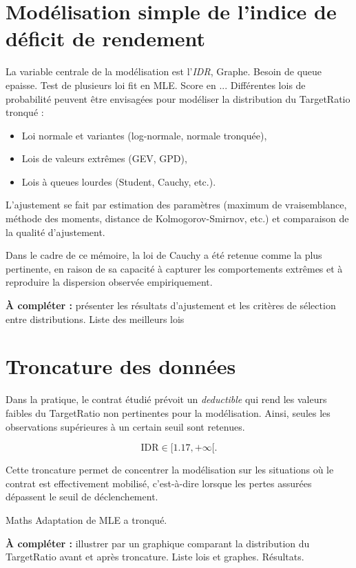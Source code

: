 \documentclass[11pt,a4paper,openright,twoside]{report}
\begin{document}
\section{Modélisation simple de l'indice de déficit de rendement}
La variable centrale de la modélisation est l'\textit{IDR}, 
Graphe.
Besoin de queue epaisse.
Test de plusieurs loi
fit en MLE. Score en ...
Différentes lois de probabilité peuvent être envisagées pour modéliser la distribution du TargetRatio tronqué :  
\begin{itemize}
    \item Loi normale et variantes (log-normale, normale tronquée),
    \item Lois de valeurs extrêmes (GEV, GPD),
    \item Lois à queues lourdes (Student, Cauchy, etc.).
\end{itemize}

L’ajustement se fait par estimation des paramètres (maximum de vraisemblance, méthode des moments, distance de Kolmogorov-Smirnov, etc.) et comparaison de la qualité d’ajustement.  

Dans le cadre de ce mémoire, la loi de Cauchy a été retenue comme la plus pertinente, en raison de sa capacité à capturer les comportements extrêmes et à reproduire la dispersion observée empiriquement.  

\textbf{À compléter :} présenter les résultats d’ajustement et les critères de sélection entre distributions.
Liste des meilleurs lois


\section{Troncature des données}
Dans la pratique, le contrat étudié prévoit un \textit{deductible} qui rend les valeurs faibles du TargetRatio non pertinentes pour la modélisation. Ainsi, seules les observations supérieures à un certain seuil sont retenues.  

\begin{equation}
    \text{IDR} \in [1.17, +\infty[.
\end{equation}

Cette troncature permet de concentrer la modélisation sur les situations où le contrat est effectivement mobilisé, c’est-à-dire lorsque les pertes assurées dépassent le seuil de déclenchement.  

Maths Adaptation de MLE a tronqué.

\textbf{À compléter :} illustrer par un graphique comparant la distribution du TargetRatio avant et après troncature.
Liste lois et graphes.
Résultats.
\end{document}
